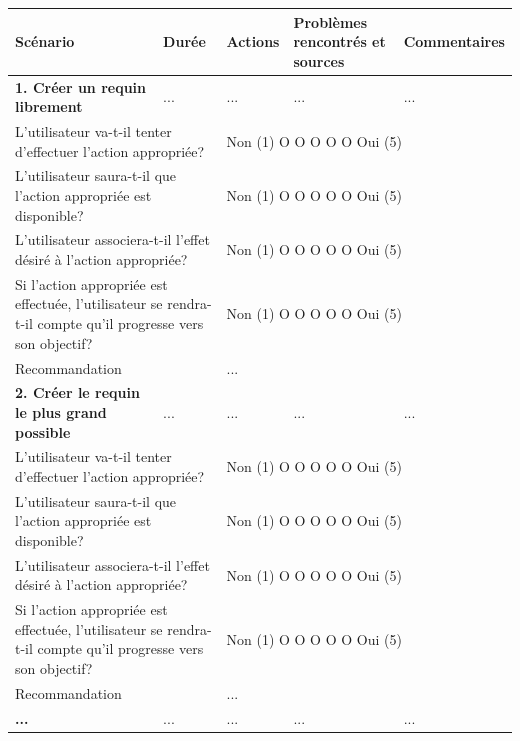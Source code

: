 \documentclass{article}
\begin{document}
\begin{table}[h]
\centering
\begin{tabular}{|p{6cm}|p{1.5cm}|p{1.5cm}|p{2.5cm}|p{3.5cm}|}
\hline
\textbf{Scénario} & \textbf{Durée} & \textbf{Actions} & \textbf{Problèmes rencontrés et sources} & \textbf{Commentaires} \\ \hline
\textbf{1. Créer un requin librement} & ... & ... & ... & ... \\ \hline
\multicolumn{2}{|p{7.5cm}|}{L’utilisateur va-t-il tenter d’effectuer l’action appropriée?} & \multicolumn{3}{p{7.5cm}|}{Non (1) O O O O O Oui (5)} \\ \hline
\multicolumn{2}{|p{7.5cm}|}{L’utilisateur saura-t-il que l’action appropriée est disponible?} & \multicolumn{3}{p{7.5cm}|}{Non (1) O O O O O Oui (5)} \\ \hline
\multicolumn{2}{|p{7.5cm}|}{L’utilisateur associera-t-il l’effet désiré à l’action appropriée?} & \multicolumn{3}{p{7.5cm}|}{Non (1) O O O O O Oui (5)} \\ \hline
\multicolumn{2}{|p{7.5cm}|}{Si l’action appropriée est effectuée, l’utilisateur se rendra-t-il compte qu’il progresse vers son objectif?} & \multicolumn{3}{p{7.5cm}|}{Non (1) O O O O O Oui (5)} \\ \hline
\multicolumn{2}{|p{7.5cm}|}{Recommandation} & \multicolumn{3}{p{7.5cm}|}{...} \\ \hline
\textbf{2. Créer le requin le plus grand possible} & ... & ... & ... & ... \\ \hline
\multicolumn{2}{|p{7.5cm}|}{L’utilisateur va-t-il tenter d’effectuer l’action appropriée?} & \multicolumn{3}{p{7.5cm}|}{Non (1) O O O O O Oui (5)} \\ \hline
\multicolumn{2}{|p{7.5cm}|}{L’utilisateur saura-t-il que l’action appropriée est disponible?} & \multicolumn{3}{p{7.5cm}|}{Non (1) O O O O O Oui (5)} \\ \hline
\multicolumn{2}{|p{7.5cm}|}{L’utilisateur associera-t-il l’effet désiré à l’action appropriée?} & \multicolumn{3}{p{7.5cm}|}{Non (1) O O O O O Oui (5)} \\ \hline
\multicolumn{2}{|p{7.5cm}|}{Si l’action appropriée est effectuée, l’utilisateur se rendra-t-il compte qu’il progresse vers son objectif?} & \multicolumn{3}{p{7.5cm}|}{Non (1) O O O O O Oui (5)} \\ \hline
\multicolumn{2}{|p{7.5cm}|}{Recommandation} & \multicolumn{3}{p{7.5cm}|}{...} \\ \hline
\textbf{...} & ... & ... & ... & ... \\ \hline

\end{tabular}
\end{table}
\end{document}
